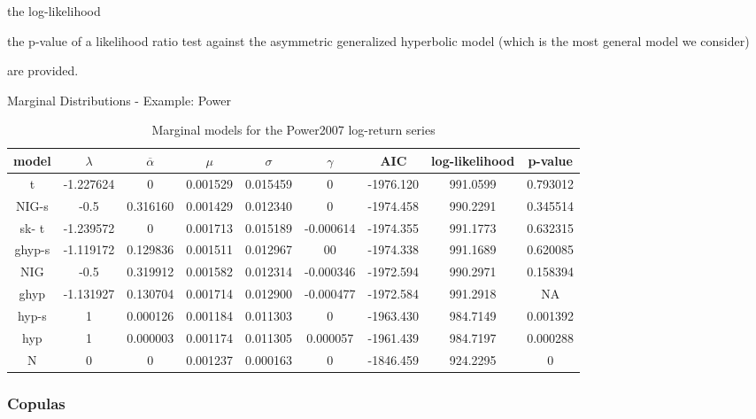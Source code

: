	the log-likelihood

	the p-value of a likelihood ratio
test against the asymmetric generalized hyperbolic model (which is
the most general model we consider)






are provided.

{Marginal Distributions - Example: Power}

{\tiny

\begin{table}[ht]
            \vspace{0.5cm}
                \begin{tabular}{c|c|c|c|c|c|c|c|c}
                    model&$\lambda$&$\overline{\alpha}$&$\mu$&$\sigma$&$\gamma$&AIC&log-likelihood&p-value\\\hline
                    t&-1.227624&0&0.001529&0.015459&0&-1976.120&991.0599&0.793012\\
                    NIG-s&-0.5&0.316160&0.001429&0.012340&0&-1974.458&990.2291&0.345514\\
                    sk- t&-1.239572&0&0.001713&0.015189&-0.000614&-1974.355&991.1773&0.632315\\
                    ghyp-s&-1.119172&0.129836&0.001511&0.012967&00&-1974.338&991.1689&0.620085\\
                    NIG&-0.5&0.319912&0.001582&0.012314&-0.000346&-1972.594&990.2971&0.158394\\
                    ghyp&-1.131927&0.130704&0.001714&0.012900&-0.000477&-1972.584&991.2918&NA\\
                    hyp-s&1&0.000126&0.001184&0.011303&0&-1963.430&984.7149&0.001392\\
                    hyp&1&0.000003&0.001174&0.011305&0.000057&-1961.439&984.7197&0.000288\\
                    N &0&0&0.001237&0.000163&0&-1846.459&924.2295&0
                \end{tabular}
                \caption{Marginal models for the Power2007 log-return series}
        \end{table}
}

\subsubsection{Copulas}


